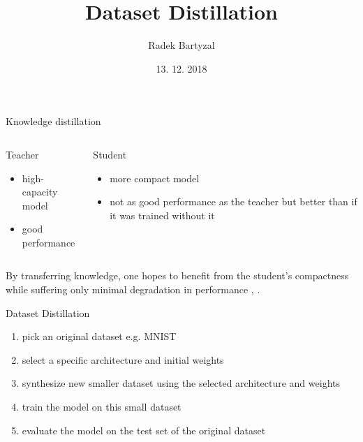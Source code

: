\documentclass{beamer}
\begin{document}
\title{Dataset Distillation}  
\author{Radek Bartyzal}
\date{13. 12. 2018} 

\frame{\titlepage} 

\begin{frame}[t]{Knowledge distillation}

\begin{columns}[t]
\begin{column}{0.5\textwidth}
Teacher
\begin{itemize}
\item high-capacity model
\item good performance
\end{itemize}
\end{column}

\begin{column}{0.5\textwidth}
Student
\begin{itemize}
\item more compact model
\item not as good performance as the teacher but better than if it was trained without it
\end{itemize}
\end{column}

\end{columns}

\vfill
By transferring knowledge, one hopes to benefit from the student’s
compactness while suffering only minimal degradation in performance \cite{cit:anc}, \cite{cit:distill}.

\end{frame}
\begin{frame}{Dataset Distillation}

\begin{enumerate}
\item pick an original dataset e.g. MNIST
\item select a specific architecture and initial weights
\item synthesize new smaller dataset using the selected architecture and weights
\item train the model on this small dataset
\item evaluate the model on the test set of the original dataset
\end{enumerate}

\end{frame}
\end{document}
